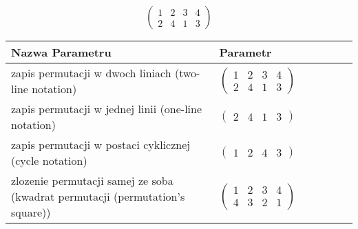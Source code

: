 \documentclass[12pt]{article}
\begin{document}
\subsection{}
\begin{center}
\[
\begin{pmatrix}
	1 & 2 & 3 & 4 \\ 
	2 & 4 & 1 & 3 
\end{pmatrix}
\]

\begin{tabular}{|m{0.6\linewidth}|m{0.4\linewidth}|}
	\hline
	Nazwa Parametru & Parametr \\
	\hline
	zapis permutacji w dwoch liniach (two-line notation) & $\begin{pmatrix} 1 & 2 & 3 & 4 \\ 
2 & 4 & 1 & 3 \end{pmatrix}$ \\ 
	\hline
	zapis permutacji w jednej linii (one-line notation) & $\begin{pmatrix} 2 & 4 & 1 & 3 \end{pmatrix}$ \\ 
	\hline
	zapis permutacji w postaci cyklicznej (cycle notation) & $\begin{pmatrix} 1 & 2 & 4 & 3 \end{pmatrix} $ \\ 
	\hline
	zlozenie permutacji samej ze soba (kwadrat permutacji (permutation's square)) & $\begin{pmatrix} 1 & 2 & 3 & 4 \\ 
4 & 3 & 2 & 1 \end{pmatrix}$ \\ 
	\hline
\end{tabular}
\end{center}
\end{document}
